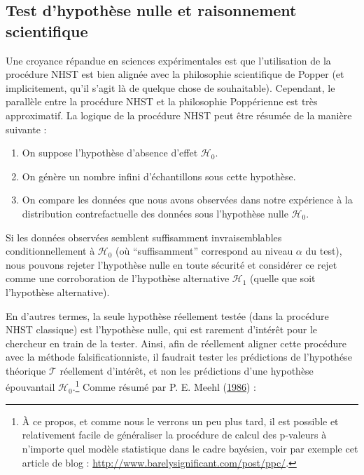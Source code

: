 \documentclass[
  a4paper,11pt,twoside,onecolumn,openright,final,oldfontcommands]{memoir}
\providecommand{\tightlist}{%
  \setlength{\itemsep}{0pt}\setlength{\parskip}{0pt}}
\theoremstyle{definition}
\theoremstyle{definition}
\theoremstyle{definition}
\theoremstyle{definition}
\theoremstyle{remark}
\begin{document}
\hypertarget{test-dhypothuxe8se-nulle-et-raisonnement-scientifique}{%
\subsection{Test d'hypothèse nulle et raisonnement scientifique}\label{test-dhypothuxe8se-nulle-et-raisonnement-scientifique}}

Une croyance répandue en sciences expérimentales est que l'utilisation de la procédure NHST est bien alignée avec la philosophie scientifique de Popper (et implicitement, qu'il s'agit là de quelque chose de souhaitable). Cependant, le parallèle entre la procédure NHST et la philosophie Poppérienne est très approximatif. La logique de la procédure NHST peut être résumée de la manière suivante :

\begin{enumerate}
\def\labelenumi{\arabic{enumi}.}
\tightlist
\item
  On suppose l'hypothèse d'absence d'effet \(\mathcal{H}_{0}\).
\item
  On génère un nombre infini d'échantillons sous cette hypothèse.
\item
  On compare les données que nous avons observées dans notre expérience à la distribution contrefactuelle des données sous l'hypothèse nulle \(\mathcal{H}_{0}\).
\end{enumerate}

Si les données observées semblent suffisamment invraisemblables conditionnellement à \(\mathcal{H}_{0}\) (où ``suffisamment'' correspond au niveau \(\alpha\) du test), nous pouvons rejeter l'hypothèse nulle en toute sécurité et considérer ce rejet comme une corroboration de l'hypothèse alternative \(\mathcal{H}_{1}\) (quelle que soit l'hypothèse alternative).

En d'autres termes, la seule hypothèse réellement testée (dans la procédure NHST classique) est l'hypothèse nulle, qui est rarement d'intérêt pour le chercheur en train de la tester. Ainsi, afin de réellement aligner cette procédure avec la méthode falsificationniste, il faudrait tester les prédictions de l'hypothése théorique \(\mathcal{T}\) réellement d'intérêt, et non les prédictions d'une hypothèse épouvantail \(\mathcal{H}_{0}\).\footnote{À ce propos, et comme nous le verrons un peu plus tard, il est possible et relativement facile de généraliser la procédure de calcul des p-valeurs à n'importe quel modèle statistique dans le cadre bayésien, voir par exemple cet article de blog : \url{http://www.barelysignificant.com/post/ppc/}.} Comme résumé par P. E. Meehl (\protect\hyperlink{ref-meehl_what_1986}{1986}) :
\end{document}
